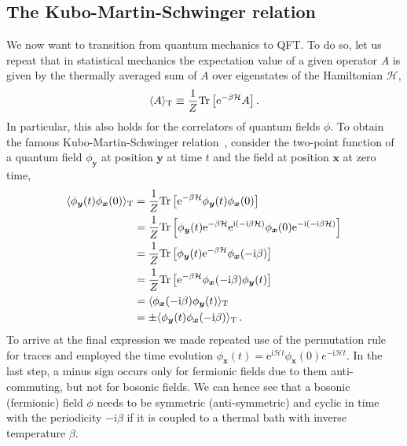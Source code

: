 \subsection{The Kubo-Martin-Schwinger relation}
We now want to transition from quantum mechanics to \ac{QFT}. To do so, let us repeat that in statistical mechanics the expectation value of a given operator $A$ is given by the thermally averaged sum of $A$ over eigenstates of the Hamiltonian $\mathcal{H}$,
\begin{align}
	\langle A \rangle_\text{T} \equiv \frac{1}{Z} \text{Tr}\left[ \mathrm{e}^{- \beta \mathcal{H}} A \right]  .
\end{align}
In particular, this also holds for the correlators of quantum fields $\phi$. To obtain the famous Kubo-Martin-Schwinger relation~\cite{Kubo:1957mj,Martin:1959jp}, consider the two-point function of a quantum field $\phi_{\bm{y}}$ at position $\bm{y}$ at time $t$ and the field at position $\bm{x}$ at zero time, 
\begin{align}
	\langle \phi_{\bm{y}}(t) \phi_{\bm{x}}(0) \rangle_\text{T} &= \frac{1}{Z} \text{Tr} \left[ \mathrm{e}^{- \beta \mathcal{H}}  \phi_{\bm{y}}(t) \phi_{\bm{x}}(0)  \right] \nonumber\\
	&= \frac{1}{Z} \text{Tr} \left[ \phi_{\bm{y}}(t)   \mathrm{e}^{-\beta \mathcal{H}} \mathrm{e}^{\mathrm{i} (-\mathrm{i} \beta \mathcal{H})}  \phi_{\bm{x}}(0)  \mathrm{e}^{-\mathrm{i} (-\mathrm{i}\beta \mathcal{H})}  \right] \nonumber\\
	&= \frac{1}{Z} \text{Tr} \left[  \phi_{\bm{y}}(t)  \mathrm{e}^{- \beta \mathcal{H}}  \phi_{\bm{x}}(- \mathrm{i} \beta)  \right] \nonumber\\
	&= \frac{1}{Z} \text{Tr} \left[ \mathrm{e}^{- \beta\mathcal{H}} \phi_{\bm{x}}(- \mathrm{i} \beta)  \phi_{\bm{y}}(t)  \right] \nonumber\\
	&= \langle \phi_{\bm{x}}(- \mathrm{i} \beta)  \phi_{\bm{y}}(t) \rangle_\text{T} \nonumber\\
	&= \pm \langle \phi_{\bm{y}}(t)  \phi_{\bm{x}}(- \mathrm{i} \beta) \rangle_\text{T} \, . \label{eq:KMS}
\end{align}
To arrive at the final expression we made repeated use of the permutation rule for traces and employed the time evolution $\phi_{\bm{x}}(t) = \mathrm{e}^{\mathrm{i} \mathcal{H} t} \phi_{\bm{x}}(0) e^{-\mathrm{i} \mathcal{H} t}$. In the last step, a minus sign occurs only for fermionic fields due to them anti-commuting, but not for bosonic fields. We can hence see that  a bosonic (fermionic) field $\phi$ needs to be symmetric (anti-symmetric) and cyclic in time with the periodicity $- \mathrm{i} \beta$ if it is coupled to a thermal bath with inverse temperature $\beta$.

